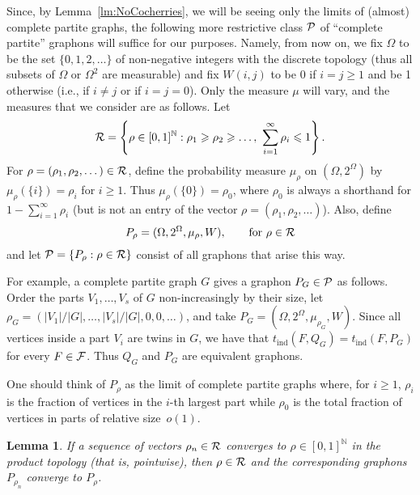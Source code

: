 \documentclass[12pt]{article}
\newtheorem{lemma}[theorem]{Lemma}
\theoremstyle{definition}
\theoremstyle{remark}
\newcommand{\C}[1]{{\protect\mathcal{#1}}}
\newcommand{\tind}{t_{\mathrm{ind}}}
\newcommand{\I}[1]{{\mathbb #1}}
\renewcommand{\mid}{:}
\renewcommand{\ge}{\geqslant}
\renewcommand{\le}{\leqslant}
\begin{document}
Since, by Lemma~\ref{lm:NoCocherries}, we will be seeing only the limits of (almost) complete partite graphs, the following more restrictive class $\C P$ of ``complete partite'' graphons will suffice for our purposes. 
Namely, from now on, we fix $\Omega$ to be the set $\{0,1,2,\dots\}$ of non-negative integers with the discrete topology (thus all subsets of $\Omega$ or $\Omega^2$ are measurable) and fix $W(i,j)$ to be 0 if $i=j\ge 1$ and be 1 otherwise (i.e., if $i\not=j$ or if $i=j=0$). Only the measure $\mu$ will vary, and the measures that we consider are as follows. Let
$$
 \C{R}=\left\{\rho\in [0,1]^{\I N}\mid \rho_1\ge \rho_2\ge\dots,\ \sum_{i=1}^\infty \rho_i\le 1\right\}.
 $$ 
 For $\rho=(\rho_1,\rho_2,\dots)\in\C{R}$, define the probability measure $\mu_\rho$ on $(\Omega,2^\Omega)$ by $\mu_\rho(\{i\})=\rho_i$ for $i\ge1$. Thus $\mu_\rho(\{0\})=\rho_0$, where $\rho_0$ is always a shorthand for $1-\sum_{i=1}^\infty \rho_i$ (but is not an entry of the vector $\rho=(\rho_1,\rho_2,\dots)$).
 Also, define
 $$
  P_\rho=(\Omega,2^\Omega,\mu_\rho,W),\qquad\mbox{for $\rho\in\C{R}$}
  $$
  and let $\C P=\{P_\rho\mid \rho\in\C{R}\}$ consist of all graphons that arise this way.
  
 
For example, a complete partite graph $G$ gives a graphon $P_G\in\C P$ as follows. Order the parts $V_1,\dots,V_s$ of $G$ non-increasingly by their size, let $\rho_G=(|V_1|/|G|,\dots,|V_s|/|G|,0,0,\dots)$, and take $P_G=(\Omega,2^\Omega,\mu_{\rho_G},W)$. Since all vertices inside a part $V_i$ are twins in $G$, we have that $\tind(F,Q_G)=\tind(F,P_G)$ for every $F\in\C F$. Thus $Q_G$ and $P_G$ are equivalent graphons.

One should think of $P_\rho$ as the limit of complete partite graphs where, for $i\ge 1$, $\rho_i$ is the fraction of vertices in the $i$-th largest part while $\rho_0$ is the total fraction of vertices in parts of relative size~$o(1)$. 



\begin{lemma}\label{lm:pointwise} If a sequence of vectors $\rho_{n}\in \C{R}$ converges to $\rho\in [0,1]^{\I N}$ in the product topology (that is, pointwise), then $\rho\in\C{R}$ and
the corresponding graphons $P_{\rho_{n}}$ converge to $P_\rho$.\end{lemma}
\end{document}
